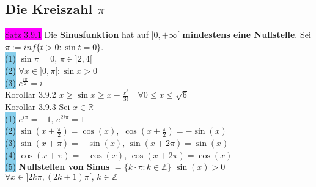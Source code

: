 \documentclass[landscape, 10pt]{article}
\newcommand{\R}{\mathbb{R}}
\begin{document}
\begin{multicols}{3}
       \subsection{Die Kreiszahl $\pi$}
              \colorbox{magenta}{Satz 3.9.1} Die \textbf{Sinusfunktion} hat auf 
                     \textcolor{NavyBlue}{$]0,+\infty[$}
                     \textbf{mindestens eine Nullstelle}. Sei 
                     \textcolor{NavyBlue}{$\pi:=inf\{t>0:\sin t=0\}$}.\\
                     \colorbox{SkyBlue}{(1)} 
                            \textcolor{NavyBlue}{$\sin\pi=0,\,\pi\in]2,4[$}\\
                     \colorbox{SkyBlue}{(2)} 
                            \textcolor{NavyBlue}{$\forall x\in]0,\pi[:\sin x>0$}\\
                     \colorbox{SkyBlue}{(3)} 
                            \textcolor{NavyBlue}{$e^{\frac{i\pi}{2}}=i$}\\
              \colorbox{BurntOrange}{Korollar 3.9.2} \textcolor{NavyBlue}{
                     $x\geqslant\sin x\geqslant x-\frac{x^3}{3!}\quad
                     \forall0\leqslant x\leqslant\sqrt{6}$}\\
              \colorbox{BurntOrange}{Korollar 3.9.3}
                     Sei \textcolor{NavyBlue}{$x\in\R$}\\
                     \colorbox{SkyBlue}{(1)} 
                            \textcolor{NavyBlue}{$e^{i\pi}=-1,\,e^{2i\pi}=1$}\\ 
                     \colorbox{SkyBlue}{(2)} 
                            \textcolor{NavyBlue}{$\sin(x+\frac{\pi}{2})=\cos(x)$},\,
                            \textcolor{NavyBlue}{$\cos(x+\frac{\pi}{2})=-\sin(x)$}\\ 
                     \colorbox{SkyBlue}{(3)} 
                            \textcolor{NavyBlue}{
                            $\sin(x+\pi)=-\sin(x),\,\sin(x+2\pi)=\sin(x)$}\\
                     \colorbox{SkyBlue}{(4)}
                            \textcolor{NavyBlue}{
                            $\cos(x+\pi)=-\cos(x),\,\cos(x+2\pi)=\cos(x)$}\\
                     \colorbox{SkyBlue}{(5)}
                            \textbf{Nullstellen von Sinus} 
                            \textcolor{NavyBlue}{
                            $=\{k\cdot\pi:k\in\mathbb{Z}\}$} \qquad
                            \textcolor{NavyBlue}{
                            $\sin(x)>0$\quad
                            $\forall x\in]2k\pi,(2k+1)\pi[,\,k\in\mathbb{Z}$}\\

\end{multicols}
\end{document}
